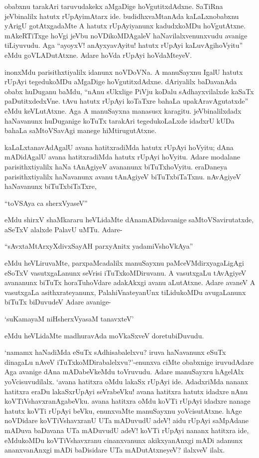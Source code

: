 obabxnu tarakAri taruvudakekx aMgaDige hoVgutitxdAdxne. SaTiRna jeVbinalilx hatutx rUpAyimAtarx ide. budidhxvaMtanAda kaLaLxnobabxnu yArigU gotAtxgadaMte A hatutx rUpAyiyanunx kadudxkoMDu hoVgutAtxne. mAkeRTiTxge hoVgi jeVbu noVDikoMDAgaleV haNavilalxvenunxvudu avanige tiLiyuvudu. Aga ``ayoyxV! anAyxyavAyitu! hatutx rUpAyi kaLuvAgihoVyitu'' eMdu goVLADutAtxne. Adare hoVda rUpAyi hoVdaMteyeV.

inonxMdu parisithxtiyalilx idanunx noVDoVNa. A manuSayxnu IgalU hatutx rUpAyi tegedukoMDu aMgaDige hoVgutitxdAdxne. dAriyalilx baDavanAda obabx huDuganu baMdu, ``nAnu sUkxlige PiVju koDalu sAdhayxvilalxde kaSaTx paDutitxdedxVne. tAvu hatutx rUpAyi koTaTxre bahaLa upakAravAgutatxde'' eMdu keVLutAtxne. Aga A manuSayxna manasusx karagitu. jeVbinalilxdadx haNavanunx huDuganige koTuTx tarakAri tegedukoLaLxde idadxrU kUDa bahaLa saMtoVSavAgi manege hiMtirugutAtxne.

kaLaLxtanavAdAgalU avana hatitxradiMda hatutx rUpAyi hoVyitu; dAna mADidAgalU avana hatitxradiMda hatutx rUpAyi hoVyitu. Adare modalane parisithxtiyalilx haNa tAnAgiyeV avananunx biTuTxhoVyitu. eraDaneya parisithxtiyalilx haNavanunx avanu tAnAgiyeV biTuTxbiTaTxnu. nAvAgiyeV haNavanunx biTuTxbiTaTxre,

\begin{shloka}
``toVSAya ca sherxVyaseV''
\end{shloka}

\noindent eMdu shirxV shaMkararu heVLidaMte dAnamADidavanige saMtoVSavirutatxde, aSeTxV alalxde PalavU uMTu. Adare-

\begin{shloka}
``sAvxtaMtArxyXdivxSayAH parxyAnitx yadamiVshoVkAya''
\end{shloka}

\noindent eMdu heVLiruvaMte, parxpaMcadalilx manuSayxnu paMceVMdirxyagaLigAgi eSoTxV vasutxgaLanunx seVrisi iTuTxkoMDiruvanu. A vasutxgaLu tAvAgiyeV avananunx biTuTx horaTuhoVdare adakAkxgi avanu aLutAtxne. Adare avaneV A vasutxgaLa asithxrateyanunx, PalahiVnateyanUnx tiLidukoMDu avugaLanunx biTuTx biDuvudeV Adare avanige-

\begin{shloka}
`suKamayaM niHsherxVyasaM tanavxteV'
\end{shloka}

\noindent eMdu heVLidaMte madhuravAda moVkaSxveV doretubiDuvudu.

`namamx haNadiMda eSuTx sAdhisabalelxvu? iruva haNavanunx eSuTx dinagaLu nAveV iTuTxkoMDirabalelxvu?'-enunxva ciMte obabxnige iruvudAdare Aga avanige dAna mADabeVkeMdu toVruvudu. Adare manuSayxru hAgelAlx yoVcisuvudilalx. `avana hatitxra oMdu lakaSx rUpAyi ide. AdadxriMda nananx hatitxra eraDu lakaSxrUpAyi seVrabeVku! avana hatitxra hatutx idadxre nAnu koVTiVshavxranAgabeVku. avana hatitxra oMdu koVTi rUpAyi idadxre nanage hatutx koVTi rUpAyi beVku, enunxvaMte manuSayxnu yoVcisutAtxne. hAge noVDidare koVTiVshavxranU UTa mADuvudU adeV! aidu rUpAyi saMpAdane mADuva baDavana UTa mADuvudU adeV! koVTi rUpAyi nananx hatitxra ide, eMdukoMDu koVTiVshavxranu cinanxvanunx akikxyanAnxgi mADi adanunx ananxvanAnxgi mADi baDisidare UTa mADutAtxneyeV? ilalxveV ilalx.

